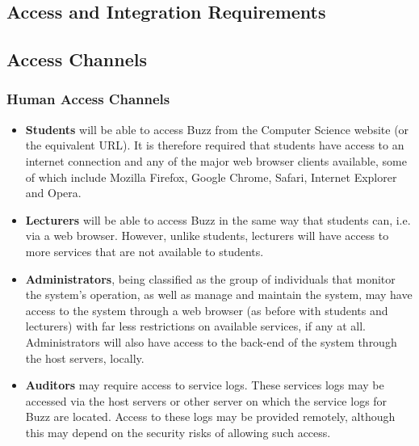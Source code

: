 \documentclass[11pt]{article}
\begin{document}


\tableofcontents	%

	\newpage
	\begin{center}
	\section{\textbf{\huge{Access and Integration Requirements}}}
	\end{center}

	\subsection{\textbf{\huge{Access Channels}}}
	\subsubsection{\textbf{Human Access Channels}}
	\begin{itemize}
		\item
		\textbf{Students} will be able to access Buzz from the Computer Science website (or the equivalent URL). It is therefore required that students have access to an internet connection and any of the major web browser clients available, some of which include Mozilla Firefox, Google Chrome, Safari, Internet Explorer and Opera.
		\item
		\textbf{Lecturers} will be able to access Buzz in the same way that students can, i.e. via a web browser. However, unlike students, lecturers will have access to more services that are not available to students.
		\item
		\textbf{Administrators}, being classified as the group of individuals that monitor the system's operation, as well as manage and maintain the system, may have access to the system through a web browser (as before with students and lecturers) with far less restrictions on available services, if any at all. Administrators will also have access to the back-end of the system through the host servers, locally. 
		\item
		 \textbf{Auditors} may require access to service logs. These services logs may be accessed via the host servers or other server on which the service logs for Buzz are located. Access to these logs may be provided remotely, although this may depend on the security risks of allowing such access.
	\end{itemize}
	
\end{document}
